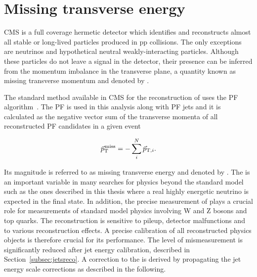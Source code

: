 \section{Missing transverse energy}\label{sec:met}

CMS is a full coverage hermetic detector which identifies and reconstructs almost all stable or long-lived particles produced in pp collisions. 
The only exceptions are neutrinos and hypothetical neutral weakly-interacting particles.
Although these particles do not leave a signal in the detector, their presence can be inferred from the momentum imbalance in the transverse plane,
a quantity known as missing transverse momentum and denoted by \ptvecmiss.

The standard method available in CMS for the reconstruction of \ptvecmiss uses the PF algorithm~\cite{1748-0221-6-09-P09001}.
The PF \ptvecmiss is used in this analysis along with PF jets and it is calculated as the negative vector sum of the transverse momenta of all reconstructed PF candidates in a given event

\begin{equation}
{\vec p}_{\mathrm{T}}^{\kern1pt\text{miss}} = -\sum_{i}^{N}{\vec p}_{\mathrm{T},i}.
\end{equation}

Its magnitude is referred to as missing transverse energy and denoted by \ETmiss.
The \ETmiss is an important variable in many searches for physics beyond the standard model such as the ones described in this thesis where a real highly energetic neutrino is expected in the final state.
In addition, the precise measurement of \ETmiss plays a crucial role for measurements of standard model physics involving W and Z bosons and top quarks.
The \ptvecmiss reconstruction is sensitive to pileup, detector malfunctions and to various reconstruction effects. A precise calibration of all reconstructed physics objects is therefore crucial for its performance.
The level of mismeasurement is significantly reduced after jet energy calibration, described in Section~\ref{subsec:jetsreco}.
A correction to the \ptvecmiss is derived by propagating the jet energy scale corrections as described in the following.

